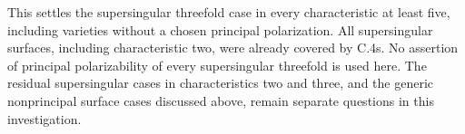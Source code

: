 This settles the supersingular threefold case in every
characteristic at least five, including varieties without a
chosen principal polarization. All supersingular surfaces,
including characteristic two, were already covered by C.4s.
No assertion of principal polarizability of every supersingular
threefold is used here. The residual supersingular cases in
characteristics two and three, and the generic nonprincipal
surface cases discussed above, remain separate questions in
this investigation.
